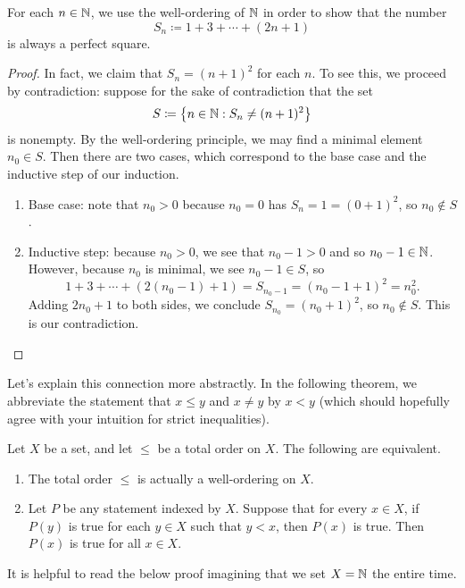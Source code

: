 \documentclass[../main.tex]{subfiles}
\begin{document}
\begin{example} \label{exe:perfect-square-wop}
    For each $n\in\mathbb N$, we use the well-ordering of $\mathbb N$ in order to show that the number
    \[S_n\coloneqq1+3+\cdots+(2n+1)\]
    is always a perfect square.
\end{example}
\begin{proof}
    In fact, we claim that $S_n=(n+1)^2$ for each $n$. To see this, we proceed by contradiction: suppose for the sake of contradiction that the set
    \[S\coloneqq\left\{n\in\mathbb N:S_n\ne(n+1)^2\right\}\]
    is nonempty. By the well-ordering principle, we may find a minimal element $n_0\in S$. Then there are two cases, which correspond to the base case and the inductive step of our induction.
    \begin{enumerate}
        \item Base case: note that $n_0>0$ because $n_0=0$ has $S_n=1=(0+1)^2$, so $n_0\notin S$.
        \item Inductive step: because $n_0>0$, we see that $n_0-1>0$ and so $n_0-1\in\mathbb N$. However, because $n_0$ is minimal, we see $n_0-1\in S$, so
        \[1+3+\cdots+(2(n_0-1)+1)=S_{n_0-1}=(n_0-1+1)^2=n_0^2.\]
        Adding $2n_0+1$ to both sides, we conclude $S_{n_0}=(n_0+1)^2$, so $n_0\notin S$. This is our contradiction.
        \qedhere
    \end{enumerate}
\end{proof}
Let's explain this connection more abstractly. In the following theorem, we abbreviate the statement that $x \leq y$ and $x \neq y$ by $x < y$ (which should hopefully agree with your intuition for strict inequalities).
\begin{theorem} \label{thm:well-order-is-induction}
    Let $X$ be a set, and let $\le$ be a total order on $X$. The following are equivalent.
    \begin{enumerate}[label=(\alph*)]
        \item The total order $\le$ is actually a well-ordering on $X$.
        \item Let $P$ be any statement indexed by $X$. Suppose that for every $x \in X$, if $P(y)$ is true for each $y \in X$ such that $y < x$, then $P(x)$ is true. Then $P(x)$ is true for all $x \in X$.
    \end{enumerate}
\end{theorem}
It is helpful to read the below proof imagining that we set $X=\mathbb N$ the entire time.
\end{document}
